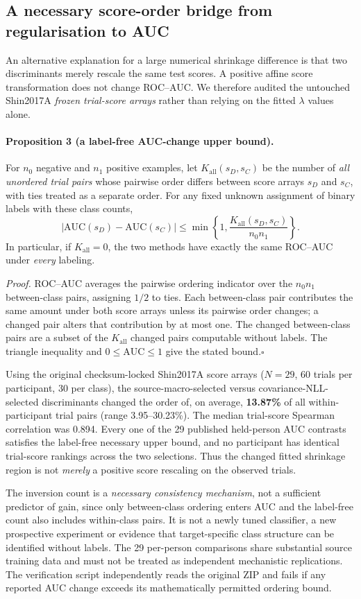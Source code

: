 \subsection{A necessary score-order bridge from regularisation to AUC}
\label{sec:v15-score-bridge}
An alternative explanation for a large numerical shrinkage difference
is that two discriminants merely rescale the same test scores.
A positive affine score transformation does not change ROC--AUC.
We therefore audited the untouched Shin2017A \emph{frozen
trial-score arrays} rather than relying on the fitted $\lambda$
values alone.

\paragraph{Proposition 3 (a label-free AUC-change upper bound).}
For $n_0$ negative and $n_1$ positive examples, let
$K_{\mathrm{all}}(s_D,s_C)$ be the number of \emph{all unordered trial
pairs} whose pairwise order differs between score arrays $s_D$ and
$s_C$, with ties treated as a separate order. For any fixed unknown
assignment of binary labels with these class counts,
\[
 \left|\mathrm{AUC}(s_D)-\mathrm{AUC}(s_C)\right|
 \le\min\left\{1,\frac{K_{\mathrm{all}}(s_D,s_C)}{n_0n_1}\right\}.
\]
In particular, if $K_{\mathrm{all}}=0$, the two methods have exactly
the same ROC--AUC under \emph{every} labeling.

\emph{Proof.}
ROC--AUC averages the pairwise ordering indicator over the
$n_0n_1$ between-class pairs, assigning $1/2$ to ties.
Each between-class pair contributes the same amount under
both score arrays unless its pairwise order changes; a
changed pair alters that contribution by at most one.
The changed between-class pairs are a subset of the
$K_{\mathrm{all}}$ changed pairs computable without labels.
The triangle inequality and $0\le\mathrm{AUC}\le1$
give the stated bound.\hfill$\square$

Using the original checksum-locked Shin2017A score arrays
($N=29$, 60 trials per participant, 30 per class), the
source-macro-selected versus covariance-NLL-selected
discriminants changed the order of, on average,
\textbf{13.87\%} of all within-participant trial pairs
(range 3.95--30.23\%). The median trial-score Spearman
correlation was 0.894. Every one of the 29 published
held-person AUC contrasts satisfies the label-free
necessary upper bound, and no participant has
identical trial-score rankings across the two selections.
Thus the changed fitted shrinkage region is not
\emph{merely} a positive score rescaling on the observed
trials.

The inversion count is a \emph{necessary consistency
mechanism}, not a sufficient predictor of gain, since
only between-class ordering enters AUC and the
label-free count also includes within-class pairs.
It is not a newly tuned classifier, a new prospective
experiment or evidence that target-specific class
structure can be identified without labels. The
29 per-person comparisons share substantial source
training data and must not be treated as independent
mechanistic replications. The verification script
independently reads the original ZIP and fails if
any reported AUC change exceeds its mathematically
permitted ordering bound.
